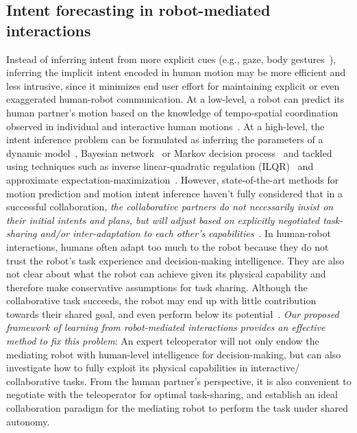\documentclass[letterpaper, 11 pt, onecolumn]{article}
\begin{document}
\subsection{Intent forecasting in robot-mediated interactions}\label{sec:related-intent}

\noindent
Instead of inferring intent from more explicit cues (e.g., gaze, body gestures~\cite{huang2016anticipatory}), inferring the implicit intent encoded in human motion may be more efficient and less intrusive, since it minimizes end user effort for maintaining explicit or even exaggerated human-robot communication. At a low-level, a robot can predict its human partner's motion based on the knowledge of tempo-spatial coordination observed in individual and interactive human motions~\cite{Hogan_Flash:85, sisbot2012human,huber2010assist, glasauer2010interacting, strabala2013towards, li2015rssworkshop, perez2015fast,maeda2017phase}. At a high-level, the intent inference problem can be formulated as inferring the parameters of a dynamic model~\cite{wang2013probabilistic}, Bayesian network~\cite{liu2016fuzzy} or Markov decision process~\cite{mcghan2015human} and tackled using techniques such as inverse linear-quadratic regulation (ILQR)~\cite{monfort2015intent} and approximate expectation-maximization~\cite{ravichandar2017human}. However, state-of-the-art methods for motion prediction and motion intent inference haven't fully considered that in a successful collaboration, \textit{the collaborative partners do not necessarily insist on their initial intents and plans, but will adjust based on explicitly negotiated task-sharing and/or inter-adaptation to each other's capabilities}~\cite{nikolaidis2017human}. In human-robot interactions, %
humans often adapt too much to the robot because they do not trust the robot's task experience and decision-making intelligence. They are also not clear about what the robot can achieve given its physical capability and therefore make conservative assumptions for task sharing. Although the collaborative task succeeds, the robot may end up with little contribution towards their shared goal, and even perform below its potential~\cite{hancock2011meta,lee2013computationally,salem2015would}. \textit{Our proposed framework of learning from robot-mediated interactions provides an effective method to fix this problem}: An expert teleoperator will not only endow the mediating robot with human-level intelligence for decision-making, but can also investigate how to fully exploit its physical capabilities in interactive/ collaborative tasks. From the human partner's perspective, it is also convenient to negotiate with the teleoperator for optimal task-sharing, and establish an ideal collaboration paradigm for the mediating robot to perform the task under shared autonomy.  
\end{document}
